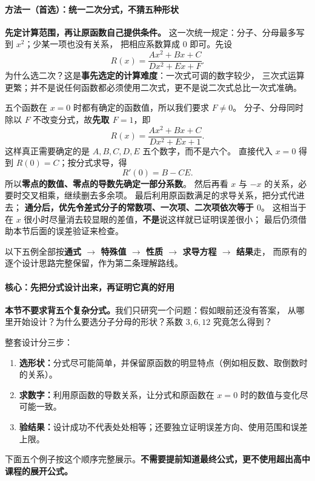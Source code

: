 
\clearpage
\begin{proofbox}

\paragraph{方法一（首选）：统一二次分式，不猜五种形状}
\textbf{先定计算范围，再让原函数自己提供条件。}
这一次统一规定：分子、分母最多写到 $x^2$；少某一项也没有关系，
把相应系数算成 $0$ 即可。先设
\[
 \boxed{R(x)=\frac{Ax^2+Bx+C}{Dx^2+Ex+F}}.
\]
为什么选二次？这是\textbf{事先选定的计算难度}：一次式可调的数字较少，
三次式运算更繁；并不是说任何函数都必须使用二次式，更不是说二次式总比一次式准确。

五个函数在 $x=0$ 时都有确定的函数值，所以我们要求 $F\ne0$。
分子、分母同时除以 $F$ 不改变分式，故\textbf{先取 $F=1$}，即
\[
 R(x)=\frac{Ax^2+Bx+C}{Dx^2+Ex+1}.
\]
这样真正需要确定的是 $A,B,C,D,E$ 五个数字，而不是六个。
直接代入 $x=0$ 得到 $R(0)=C$；按分式求导，得
\[
 \boxed{R'(0)=B-CE}.
\]
所以\textbf{零点的数值、零点的导数先确定一部分系数}。
然后再看 $x$ 与 $-x$ 的关系，必要时交叉相乘，继续删去多余项。
最后利用原函数满足的求导关系，把分式代进去；
\textbf{通分后，优先令差式分子的常数项、一次项、二次项依次等于 $0$}。
这相当于在 $x$ 很小时尽量消去较显眼的差值，\textbf{不是}说这样就已证明误差很小；
最后仍须借助本节后面的误差验证来检查。

以下五例全部按\textbf{通式 $\to$ 特殊值 $\to$ 性质 $\to$ 求导方程 $\to$ 结果}走，
而原有的逐个设计思路完整保留，作为第二条理解路线。
\medskip

\paragraph{核心：先把分式设计出来，再证明它真的好用}
\textbf{本节不要求背五个复杂分式。}我们只研究一个问题：假如眼前还没有答案，
从哪里开始设计？为什么要选分子分母的形状？系数 $3,6,12$ 究竟怎么得到？

整套设计分三步：
\begin{enumerate}
\item \textbf{选形状：}分式尽可能简单，并保留原函数的明显特点（例如相反数、取倒数时的关系）。
\item \textbf{求数字：}利用原函数的导数关系，让分式和原函数在 $x=0$ 时的数值与变化尽可能一致。
\item \textbf{验结果：}设计成功不代表处处相等；还要独立证明误差方向、使用范围和误差上限。
\end{enumerate}
下面五个例子按这个顺序完整展示。\textbf{不需要提前知道最终公式，更不使用超出高中课程的展开公式。}


\end{proofbox}
